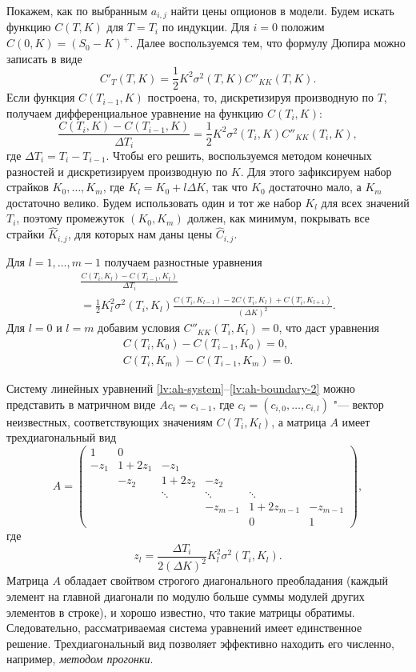 Покажем, как по выбранным $a_{i,j}$ найти цены опционов в модели.
Будем искать функцию $C(T,K)$ для $T=T_i$ по индукции. Для $i=0$ положим $C(0, K) = (S_0-K)^+$.
Далее воспользуемся тем, что формулу Дюпира можно записать в виде
\[
C'_T(T,K) = \frac12 K^2 \sigma^2(T,K)C''_{KK}(T,K).
\]
Если функция $C(T_{i-1}, K)$ построена, то, дискретизируя производную по $T$, получаем дифференциальное уравнение на функцию $C(T_i,K)$:
\[
\frac{C(T_{i},K) - C(T_{i-1},K)}{\Delta T_i} = \frac12 K^2 \sigma^2(T_i,K)C''_{KK}(T_i,K),
\]
где $\Delta T_i = T_i - T_{i-1}$.
Чтобы его решить, воспользуемся методом конечных разностей и дискретизируем производную по $K$.
Для этого зафиксируем набор страйков $K_0,\dots,K_m$, где $K_l = K_0 + l\Delta K$, так что $K_0$ достаточно мало, а $K_m$ достаточно велико.
Будем использовать один и тот же набор $K_l$ для всех значений $T_i$, поэтому промежуток $(K_0, K_m)$ должен, как минимум, покрывать все страйки $\hat K_{i,j}$, для которых нам даны цены $\hat C_{i,j}$.

Для $l=1,\dots,m-1$ получаем разностные уравнения
\begin{multline}
\label{lv:ah-system}
\frac{C(T_i,K_l) - C(T_{i-1}, K_l)}{\Delta T_i} \\
= \frac12 K_l^2 \sigma^2(T_i,K_l) \frac{C(T_i,K_{l-1}) -2C(T_i,K_l) + C(T_i,K_{l+1})}{(\Delta K)^2}.
\end{multline}
Для $l=0$ и $l=m$ добавим условия $C''_{KK}(T_i,K_l) = 0$, что даст уравнения
\begin{gather}
\label{lv:ah-boundary-1}
C(T_i,K_0) - C(T_{i-1}, K_0) = 0,\\
\label{lv:ah-boundary-2}
C(T_i,K_m) - C(T_{i-1}, K_m) = 0.
\end{gather}

Систему линейных уравнений \eqref{lv:ah-system}--\eqref{lv:ah-boundary-2} можно представить в матричном виде $A c_i = c_{i-1}$, где $c_i=(c_{i,0},\dots,c_{i,l})$ "--- вектор неизвестных, соответствующих значениям $C(T_i,K_l)$, а матрица $A$ имеет трехдиагональный вид
\[
A = \begin{pmatrix}
1 & 0 \\
-z_1 &1+2z_1 & -z_1\\
& -z_2 &1+2z_2 & -z_2\\
& & \ddots & \ddots & \ddots \\
& & & -z_{m-1} &1+2z_{m-1} & -z_{m-1}\\
& & & & 0 & 1
\end{pmatrix},
\]
где
\[
z_l = \frac{\Delta T_i}{2(\Delta K)^2} K_l^2\sigma^2(T_i,K_l).
\]
Матрица $A$ обладает свойтвом строгого диагонального преобладания (каждый элемент на главной диагонали по модулю больше суммы модулей других элементов в строке), и хорошо известно, что такие матрицы обратимы.
Следовательно, рассматриваемая система уравнений имеет единственное решение.
Трехдиагональный вид позволяет эффективно находить его численно, например, \emph{методом прогонки}.


